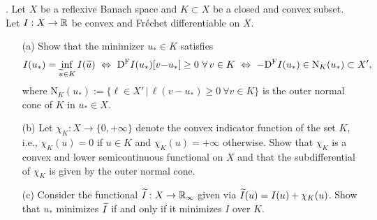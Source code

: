 \documentclass[12pt,a4paper]{article}
\begin{document}
. Let $X$ be a reflexive Banach space and $K\subset X$
be a closed and convex subset. Let $I:X\to {\mathbb R}$ be convex and Fr\'echet differentiable on $X$.

\begin{itemize}
\item[(a)]Show that the minimizer $u_*\in K$ satisfies
\[
I(u_*) = \inf_{\widetilde u\in K} I(\widetilde u)~\Leftrightarrow~
{\mathrm D}^{\mathrm F} I(u_*)[v{-}u_*]\geq 0~\forall\, v\in K~\Leftrightarrow~
-{\mathrm D}^{\mathrm F} I(u_*)\in\mathrm{N}_K(u_*)\subset X',
\]
where $\mathrm{N}_K(u_*) :=\{\ell\in X'\,|\,\ell(v{-}u_*)\geq 0 ~\forall v\in K\}$ is the outer normal cone of $K$ in $u_*\in X$.
\item[(b)] Let $\chi_K:X\to \{0,+\infty\}$ denote the convex indicator function of the set $K$, i.e.,
$\chi_K(u) = 0$ if $u\in K$ and $\chi_K(u) =+\infty$ otherwise. Show that $\chi_K$ is a convex and lower semicontinuous functional on $X$ and that the subdifferential of $\chi_K$
is given by the outer normal cone.
\item[(c)] Consider the functional $\widetilde I:X\to {\mathbb R}_\infty$ given via $\widetilde I(u) = I(u)+\chi_K(u)$. Show that 
$u_*$ minimizes $\widetilde I$ if and only if it minimizes $I$ over $K$.
\end{itemize}
\end{document}
